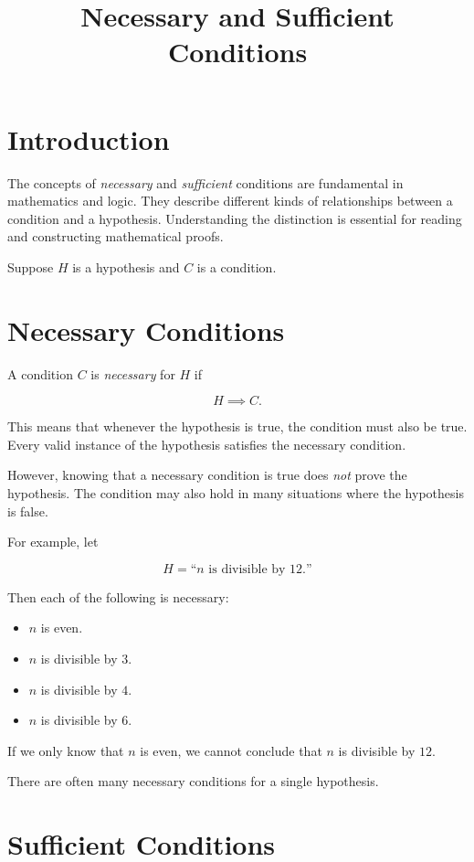 \documentclass{essay}
\title{Necessary and Sufficient Conditions}
\author{}
\date{}
\begin{document}
\maketitle

\section*{Introduction}

The concepts of \emph{necessary} and \emph{sufficient} conditions are fundamental in mathematics and logic. They describe different kinds of relationships between a condition and a hypothesis. Understanding the distinction is essential for reading and constructing mathematical proofs.

Suppose $H$ is a hypothesis and $C$ is a condition.

\section*{Necessary Conditions}

A condition $C$ is \emph{necessary} for $H$ if

\[
H \implies C.
\]

This means that whenever the hypothesis is true, the condition must also be true. Every valid instance of the hypothesis satisfies the necessary condition.

However, knowing that a necessary condition is true does \emph{not} prove the hypothesis. The condition may also hold in many situations where the hypothesis is false.

For example, let

\[
H = \text{``$n$ is divisible by 12.''}
\]

Then each of the following is necessary:

\begin{itemize}
\item $n$ is even.
\item $n$ is divisible by $3$.
\item $n$ is divisible by $4$.
\item $n$ is divisible by $6$.
\end{itemize}

If we only know that $n$ is even, we cannot conclude that $n$ is divisible by $12$.

There are often many necessary conditions for a single hypothesis.

\section*{Sufficient Conditions}
\end{document}
